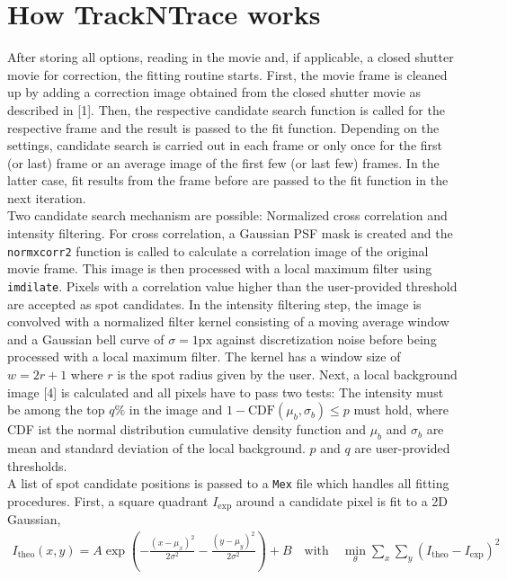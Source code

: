 \documentclass[11pt,onside]{report}
\numberwithin{equation}{chapter}
\begin{document}
\section{How TrackNTrace works}\label{sec:in-depth}
After storing all options, reading in the movie and, if applicable, a closed shutter movie for correction, the fitting routine starts. First, the movie frame is cleaned up by adding a correction image obtained from the closed shutter movie as described in [1]. Then, the respective candidate search function is called for the respective frame and the result is passed to the fit function. Depending on the settings, candidate search is carried out in each frame or only once for the first (or last) frame or an average image of the first few (or last few) frames. In the latter case, fit results from the frame before are passed to the fit function in the next iteration. \\
Two candidate search mechanism are possible: Normalized cross correlation and intensity filtering. For cross correlation, a Gaussian PSF mask is created and the \texttt{normxcorr2} function is called to calculate a correlation image of the original movie frame. This image is then processed with a local maximum filter using \texttt{imdilate}. Pixels with a correlation value higher than the user-provided threshold are accepted as spot candidates. In the intensity filtering step, the image is convolved with a normalized filter kernel  consisting of a moving average window and a Gaussian bell curve of $\sigma = \unit{1}{\mathrm{px}}$ against discretization noise before being processed with a local maximum filter. The kernel has a window size of $w = 2r+1$ where $r$ is the spot radius given by the user. Next, a local background image [4] is calculated and all pixels have to pass two tests: The intensity must be among the top $q\%$ in the image and $1-\mathrm{CDF}(\mu_b,\sigma_b) \leq p$ must hold, where CDF ist the normal distribution cumulative density function and $\mu_b$ and $\sigma_b$ are mean and standard deviation of the local background. $p$ and $q$ are user-provided thresholds.\\[10pt]
A list of spot candidate positions is passed to a \texttt{Mex} file which handles all fitting procedures. First, a square quadrant $I_\mathrm{exp}$ around a candidate pixel is fit to a 2D Gaussian,
\begin{align*}
I_\mathrm{theo}(x,y) = A\exp\left(-\frac{(x-\mu_x)^2}{2\sigma^2} - \frac{(y-\mu_y)^2}{2\sigma^2}\right) + B \quad\mathrm{with}\quad \min_\theta \sum_x\sum_y \left(I_\mathrm{theo}-I_\mathrm{exp}\right)^2
\end{align*}
\end{document}
